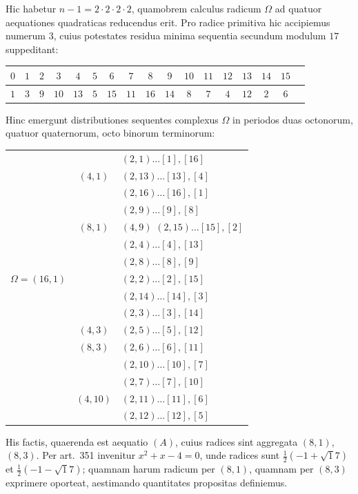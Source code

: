 \documentclass[12pt,a4paper]{article}
\theoremstyle{plain}
\theoremstyle{definition}
\theoremstyle{remark}
\begin{document}
Hic habetur $n-1=2\cdot 2\cdot 2\cdot 2$, quamobrem calculus radicum $\Omega$ ad quatuor aequationes quadraticas reducendus erit. Pro radice primitiva hic accipiemus numerum $3$, cuius potestates residua minima sequentia secundum modulum $17$ suppeditant:
\begin{center}
\begin{tabular}{c|cccccccccccccccc}
$0$ & $1$ & $2$ & $3$ & $4$ & $5$ & $6$ & $7$ & $8$ & $9$ & $10$ & $11$ & $12$ & $13$ & $14$ & $15$\\
\hline
$1$ & $3$ & $9$ & $10$ & $13$ & $5$ & $15$ & $11$ & $16$ & $14$ & $8$ & $7$ & $4$ & $12$ & $2$ & $6$
\end{tabular}
\end{center}
Hinc emergunt distributiones sequentes complexus $\Omega$ in periodos duas octonorum, quatuor quaternorum, octo binorum terminorum:
\begin{center}
\begin{tabular}{lcl}
& & $(2,1)\ldots[1],[16]$\\
& $(4,1)$ & $(2,13)\ldots[13],[4]$\\
& & $(2,16)\ldots[16],[1]$\\
& & $(2,9)\ldots[9],[8]$\\
& $(8,1)$ & $(4,9)$ $(2,15)\ldots[15],[2]$\\
& & $(2,4)\ldots[4],[13]$\\
& & $(2,8)\ldots[8],[9]$\\
$\Omega=(16,1)$ & & $(2,2)\ldots[2],[15]$\\
& & $(2,14)\ldots[14],[3]$\\
& & $(2,3)\ldots[3],[14]$\\
& $(4,3)$ & $(2,5)\ldots[5],[12]$\\
& $(8,3)$ & $(2,6)\ldots[6],[11]$\\
& & $(2,10)\ldots[10],[7]$\\
& & $(2,7)\ldots[7],[10]$\\
& $(4,10)$ & $(2,11)\ldots[11],[6]$\\
& & $(2,12)\ldots[12],[5]$
\end{tabular}
\end{center}

His factis, quaerenda est aequatio $(A)$, cuius radices sint aggregata $(8,1)$, $(8,3)$. Per art.\ 351 invenitur $x^2+x-4=0$, unde radices sunt $\frac{1}{2}(-1+\surd 17)$ et $\frac{1}{2}(-1-\surd 17)$; quamnam harum radicum per $(8,1)$, quamnam per $(8,3)$ exprimere oporteat, aestimando quantitates propositas definiemus.
\end{document}
